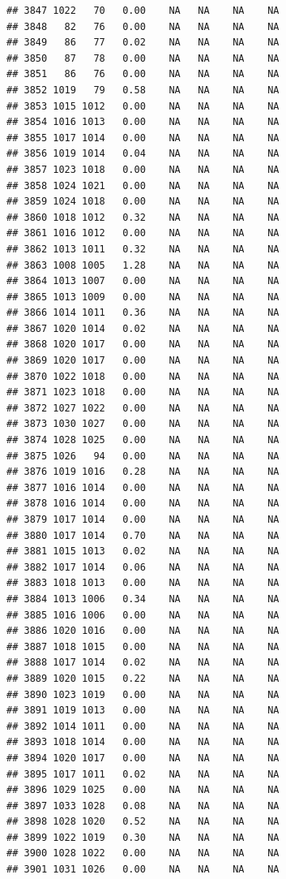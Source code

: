 \documentclass{article}\usepackage{graphicx, color}
\makeatletter
\newenvironment{kframe}{%
 \def\at@end@of@kframe{}%
 \ifinner\ifhmode%
  \def\at@end@of@kframe{\end{minipage}}%
  \begin{minipage}{\columnwidth}%
 \fi\fi%
 \def\FrameCommand##1{\hskip\@totalleftmargin \hskip-\fboxsep
 \colorbox{shadecolor}{##1}\hskip-\fboxsep
     \hskip-\linewidth \hskip-\@totalleftmargin \hskip\columnwidth}%
 \MakeFramed {\advance\hsize-\width
   \@totalleftmargin\z@ \linewidth\hsize
   \@setminipage}}%
 {\par\unskip\endMakeFramed%
 \at@end@of@kframe}
\newenvironment{knitrout}{}{} %
\makeatother
\begin{document}
\begin{knitrout}
\begin{kframe}
\begin{verbatim}
## 3847 1022   70   0.00    NA   NA    NA    NA
## 3848   82   76   0.00    NA   NA    NA    NA
## 3849   86   77   0.02    NA   NA    NA    NA
## 3850   87   78   0.00    NA   NA    NA    NA
## 3851   86   76   0.00    NA   NA    NA    NA
## 3852 1019   79   0.58    NA   NA    NA    NA
## 3853 1015 1012   0.00    NA   NA    NA    NA
## 3854 1016 1013   0.00    NA   NA    NA    NA
## 3855 1017 1014   0.00    NA   NA    NA    NA
## 3856 1019 1014   0.04    NA   NA    NA    NA
## 3857 1023 1018   0.00    NA   NA    NA    NA
## 3858 1024 1021   0.00    NA   NA    NA    NA
## 3859 1024 1018   0.00    NA   NA    NA    NA
## 3860 1018 1012   0.32    NA   NA    NA    NA
## 3861 1016 1012   0.00    NA   NA    NA    NA
## 3862 1013 1011   0.32    NA   NA    NA    NA
## 3863 1008 1005   1.28    NA   NA    NA    NA
## 3864 1013 1007   0.00    NA   NA    NA    NA
## 3865 1013 1009   0.00    NA   NA    NA    NA
## 3866 1014 1011   0.36    NA   NA    NA    NA
## 3867 1020 1014   0.02    NA   NA    NA    NA
## 3868 1020 1017   0.00    NA   NA    NA    NA
## 3869 1020 1017   0.00    NA   NA    NA    NA
## 3870 1022 1018   0.00    NA   NA    NA    NA
## 3871 1023 1018   0.00    NA   NA    NA    NA
## 3872 1027 1022   0.00    NA   NA    NA    NA
## 3873 1030 1027   0.00    NA   NA    NA    NA
## 3874 1028 1025   0.00    NA   NA    NA    NA
## 3875 1026   94   0.00    NA   NA    NA    NA
## 3876 1019 1016   0.28    NA   NA    NA    NA
## 3877 1016 1014   0.00    NA   NA    NA    NA
## 3878 1016 1014   0.00    NA   NA    NA    NA
## 3879 1017 1014   0.00    NA   NA    NA    NA
## 3880 1017 1014   0.70    NA   NA    NA    NA
## 3881 1015 1013   0.02    NA   NA    NA    NA
## 3882 1017 1014   0.06    NA   NA    NA    NA
## 3883 1018 1013   0.00    NA   NA    NA    NA
## 3884 1013 1006   0.34    NA   NA    NA    NA
## 3885 1016 1006   0.00    NA   NA    NA    NA
## 3886 1020 1016   0.00    NA   NA    NA    NA
## 3887 1018 1015   0.00    NA   NA    NA    NA
## 3888 1017 1014   0.02    NA   NA    NA    NA
## 3889 1020 1015   0.22    NA   NA    NA    NA
## 3890 1023 1019   0.00    NA   NA    NA    NA
## 3891 1019 1013   0.00    NA   NA    NA    NA
## 3892 1014 1011   0.00    NA   NA    NA    NA
## 3893 1018 1014   0.00    NA   NA    NA    NA
## 3894 1020 1017   0.00    NA   NA    NA    NA
## 3895 1017 1011   0.02    NA   NA    NA    NA
## 3896 1029 1025   0.00    NA   NA    NA    NA
## 3897 1033 1028   0.08    NA   NA    NA    NA
## 3898 1028 1020   0.52    NA   NA    NA    NA
## 3899 1022 1019   0.30    NA   NA    NA    NA
## 3900 1028 1022   0.00    NA   NA    NA    NA
## 3901 1031 1026   0.00    NA   NA    NA    NA

\end{verbatim}
\end{kframe}
\end{knitrout}
\end{document}
